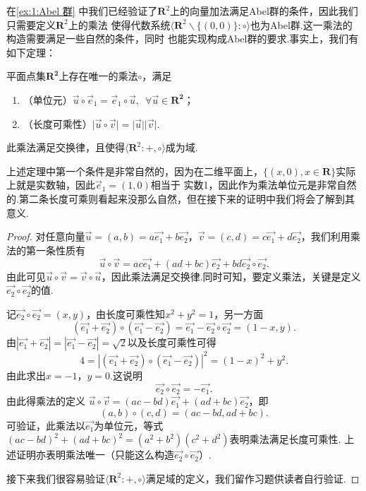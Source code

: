 在\autoref{ex:1:Abel 群} 中我们已经验证了$\mathbf{R}^2$上的向量加法满足Abel群的条件，因此我们只需要定义$\mathbf{R}^2$上的乘法
使得代数系统$\langle\mathbf{R}^2\backslash\{(0,0)\}:\circ\rangle$也为Abel群.这一乘法的构造需要满足一些自然的条件，同时
也能实现构成Abel群的要求.事实上，我们有如下定理：
\begin{theorem}\label{thm:1:复数乘法构造}
    平面点集$\mathbf{R^2}$上存在唯一的乘法$\circ$，满足
    \begin{enumerate}
        \item（单位元）$\vec{u}\circ\vec{e}_1=\vec{e}_1\circ\vec{u},\enspace\forall\vec{u}\in\mathbf{R^2}$；

        \item（长度可乘性）$\lvert\vec{u}\circ\vec{v}\rvert=\lvert\vec{u}\rvert\lvert\vec{v}\rvert$.
    \end{enumerate}

    此乘法满足交换律，且使得$\langle\mathbf{R}^2:+,\circ\rangle$成为域.
\end{theorem}

上述定理中第一个条件是非常自然的，因为在二维平面上，$\{(x,0),x\in\mathbf{R}\}$实际上就是实数轴，因此$\vec{e}_1=(1,0)$相当于
实数1，因此作为乘法单位元是非常自然的.第二条长度可乘则看起来没那么自然，但在接下来的证明中我们将会了解到其意义.

\begin{proof}
    对任意向量$\vec{u}=(a,b)=a\vec{e_1}+b\vec{e_2}$，$\vec{v}=(c,d)=c\vec{e_1}+d\vec{e_2}$，我们利用乘法的第一条性质有
    \[\vec{u}\circ\vec{v}=ac\vec{e_1}+(ad+bc)\vec{e_2}+bd\vec{e_2}\circ\vec{e_2}.\]
    由此可见$\vec{u}\circ\vec{v}=\vec{v}\circ\vec{u}$，因此乘法满足交换律.同时可知，要定义乘法，关键是定义
    $\vec{e_2}\circ\vec{e_2}$的值.

    记$\vec{e_2}\circ\vec{e_2}=(x,y)$，由长度可乘性知$x^2+y^2=1$，另一方面
    \[(\vec{e_1}+\vec{e_2})\circ(\vec{e_1}-\vec{e_2})=\vec{e_1}-\vec{e_2}\circ\vec{e_2}=(1-x,y).\]
    由$|\vec{e_1}+\vec{e_2}|=|\vec{e_1}-\vec{e_2}|=\sqrt{2}$以及长度可乘性可得
    \[4=|(\vec{e_1}+\vec{e_2})\circ(\vec{e_1}-\vec{e_2})|^2=(1-x)^2+y^2.\]
    由此求出$x=-1$，$y=0$.这说明
    \[\vec{e_2}\circ\vec{e_2}=-\vec{e_1}.\]
    由此得乘法的定义
    $\vec{u}\circ\vec{v}=(ac-bd)\vec{e_1}+(ad+bc)\vec{e_2}$，即
    \[(a,b)\circ(c,d)=(ac-bd,ad+bc).\]
    可验证，此乘法以$\vec{e_1}$为单位元，等式$(ac-bd)^2+(ad+bc)^2=(a^2+b^2)(c^2+d^2)$表明乘法满足长度可乘性.
    上述证明亦表明乘法唯一（只能这么构造$\vec{e_2}\circ\vec{e_2}$）.

    接下来我们很容易验证$\langle\mathbf{R}^2:+,\circ\rangle$满足域的定义，我们留作习题供读者自行验证.
\end{proof}

